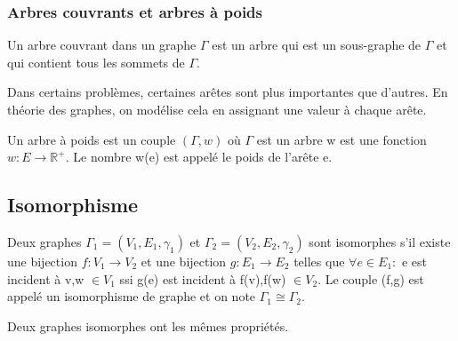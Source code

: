 
\subsubsection{Arbres couvrants et arbres à poids}

\begin{defn}
Un arbre couvrant dans un graphe $\Gamma$ est un arbre qui est un sous-graphe de $\Gamma$ et qui contient tous les sommets de $\Gamma$.
\end{defn}

Dans certains problèmes, certaines arêtes sont plus importantes que d'autres. En théorie des graphes, on modélise cela en assignant une valeur à chaque arête. 

\begin{defn}
Un arbre à poids est un couple $(\Gamma,w)$ où $\Gamma$ est un arbre w est une fonction $w: E \rightarrow \mathbb{R}^{+}$. Le nombre w(e) est appelé le poids de l'arête e.
\end{defn}

\begin{exmp}

\end{exmp}



\newpage

\subsection{Isomorphisme}

\begin{defn}
Deux graphes $\Gamma_{1} = (V_{1},E_{1},\gamma_{1})$ et $\Gamma_{2} = (V_{2},E_{2},\gamma_{2})$ sont isomorphes s'il existe une bijection $f: V_{1} \rightarrow V_{2}$ et une bijection $g: E_{1} \rightarrow E_{2}$ telles que $\forall e \in E_{1}:$ e est incident à v,w $\in V_{1}$ ssi g(e) est incident à f(v),f(w) $\in V_{2}$. Le couple (f,g) est appelé un isomorphisme de graphe et on note $\Gamma_{1} \cong \Gamma_{2}$.
\end{defn}

Deux graphes isomorphes ont les mêmes propriétés.

\begin{exmp}

\end{exmp}



